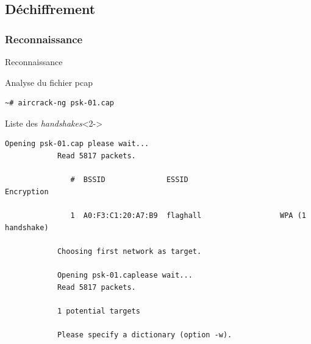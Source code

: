 \documentclass[10pt,sans,usenames,dvipsnames,french,compress]{beamer}
\begin{document}
\subsection{Déchiffrement}
\subsubsection{Reconnaissance}
\begin{frame}[fragile]{Reconnaissance}
	\begin{block}{Analyse du fichier pcap}
		\vspace{-3mm}
		\begin{lstlisting}[style=Term]
			~# aircrack-ng psk-01.cap
		\end{lstlisting}
		\vspace{-2mm}
	\end{block}

	\begin{block}{Liste des \textit{handshakes}}<2->
		\vspace{-3mm}
		\begin{lstlisting}[style=Term]
			Opening psk-01.cap please wait...
			Read 5817 packets.

			   #  BSSID              ESSID                     Encryption

			   1  A0:F3:C1:20:A7:B9  flaghall                  WPA (1 handshake)

			Choosing first network as target.

			Opening psk-01.caplease wait...
			Read 5817 packets.

			1 potential targets

			Please specify a dictionary (option -w).
		\end{lstlisting}
		\vspace{-2mm}
	\end{block}
\end{frame}
\end{document}
